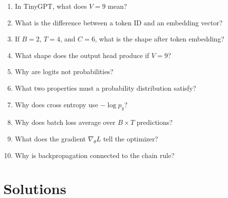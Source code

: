 \begin{enumerate}
  \item In TinyGPT, what does \(V=9\) mean?
  \item What is the difference between a token ID and an embedding vector?
  \item If \(B=2\), \(T=4\), and \(C=6\), what is the shape after token embedding?
  \item What shape does the output head produce if \(V=9\)?
  \item Why are logits not probabilities?
  \item What two properties must a probability distribution satisfy?
  \item Why does cross entropy use \(-\log p_y\)?
  \item Why does batch loss average over \(B\times T\) predictions?
  \item What does the gradient \(\nabla_\theta L\) tell the optimizer?
  \item Why is backpropagation connected to the chain rule?
\end{enumerate}

\section{Solutions}

